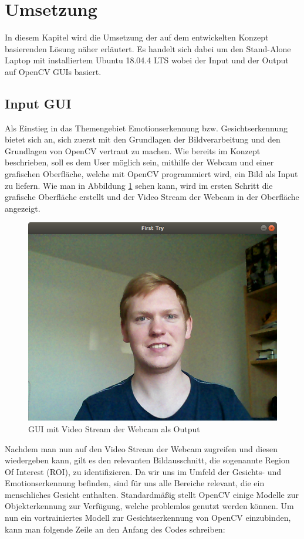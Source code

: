 \documentclass[12pt, a4paper]{scrbook}
\begin{document}
\section{Umsetzung}
In diesem Kapitel wird die Umsetzung der auf dem entwickelten Konzept basierenden Lösung näher erläutert. Es handelt sich dabei um den Stand-Alone Laptop mit installiertem Ubuntu 18.04.4 LTS wobei der Input und der Output auf OpenCV GUIs basiert.

\subsection{Input GUI}
Als Einstieg in das Themengebiet Emotionserkennung bzw. Gesichtserkennung bietet sich an, sich zuerst mit den Grundlagen der Bildverarbeitung und den Grundlagen von OpenCV vertraut zu machen. Wie bereits im Konzept beschrieben, soll es dem User möglich sein, mithilfe der Webcam und einer grafischen Oberfläche, welche mit OpenCV programmiert wird, ein Bild als Input zu liefern. Wie man in Abbildung \ref{fig:Input GUI 1} sehen kann, wird im ersten Schritt die grafische Oberfläche erstellt und der Video Stream der Webcam in der Oberfläche angezeigt.

\begin{figure}[h]
\includegraphics[width=\linewidth]{Bilder/InputGUI1.png}
\caption{GUI mit Video Stream der Webcam als Output}
\label{fig:Input GUI 1}
\end{figure}
Nachdem man nun auf den Video Stream der Webcam zugreifen und diesen wiedergeben kann, gilt es den relevanten Bildausschnitt, die sogenannte Region Of Interest (ROI), zu identifizieren. Da wir uns im Umfeld der Gesichts- und Emotionserkennung befinden, sind für uns alle Bereiche relevant, die ein menschliches Gesicht enthalten. Standardmäßig stellt OpenCV einige Modelle zur Objekterkennung zur Verfügung, welche problemlos genutzt werden können. Um nun ein vortrainiertes Modell zur Gesichtserkennung von OpenCV einzubinden, kann man folgende Zeile an den Anfang des Codes schreiben:\newline
\end{document}
